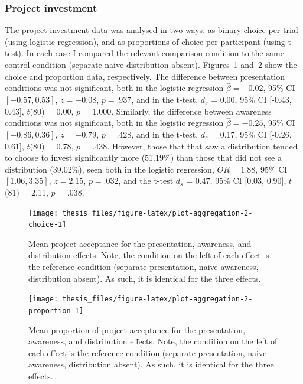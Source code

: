 \documentclass[a4paper, nobind, dvipsnames]{templates/ociamthesis}
\theoremstyle{definition}
\theoremstyle{definition}
\theoremstyle{definition}
\theoremstyle{definition}
\theoremstyle{remark}
\begin{document}
\subsubsection{Project investment}

The project investment data was analysed in two ways: as binary choice per trial
(using logistic regression), and as proportions of choice per participant (using
t-test). In each case I compared the relevant comparison condition to the same
control condition (separate naive distribution absent).
Figures~\ref{fig:plot-aggregation-2-choice}
and~\ref{fig:plot-aggregation-2-proportion} show the choice and proportion
data, respectively. The difference between presentation conditions was not
significant, both in the logistic regression
\(\hat{\beta} = -0.02\), 95\% CI \([-0.57, 0.53]\), \(z = -0.08\), \(p = .937\), and in the
t-test, \(d_s\) = 0.00, 95\% CI {[}-0.43, 0.43{]}, \(t\)(80) = 0.00, \(p\) = 1.000. Similarly, the
difference between awareness conditions was not significant, both in the
logistic regression \(\hat{\beta} = -0.25\), 95\% CI \([-0.86, 0.36]\), \(z = -0.79\), \(p = .428\),
and in the t-test, \(d_s\) = 0.17, 95\% CI {[}-0.26, 0.61{]}, \(t\)(80) = 0.78, \(p\) = .438. However,
those that that saw a distribution tended to choose to invest significantly more
(51.19\%) than those that did
not see a distribution
(39.02\%), seen both in the
logistic regression, \(OR = 1.88\), 95\% CI \([1.06, 3.35]\), \(z = 2.15\), \(p = .032\), and the
t-test \(d_s\) = 0.47, 95\% CI {[}0.03, 0.90{]}, \(t\)(81) = 2.11, \(p\) = .038.



\begin{figure}
\texttt{[image: thesis\_files/figure-latex/plot-aggregation-2-choice-1]} \caption{Mean project acceptance for the presentation, awareness, and distribution effects. Note, the condition on the left of each effect is the reference condition (separate presentation, naive awareness, distribution absent). As such, it is identical for the three effects.}\label{fig:plot-aggregation-2-choice}
\end{figure}



\begin{figure}
\texttt{[image: thesis\_files/figure-latex/plot-aggregation-2-proportion-1]} \caption{Mean proportion of project acceptance for the presentation, awareness, and distribution effects. Note, the condition on the left of each effect is the reference condition (separate presentation, naive awareness, distribution absent). As such, it is identical for the three effects.}\label{fig:plot-aggregation-2-proportion}
\end{figure}
\end{document}
